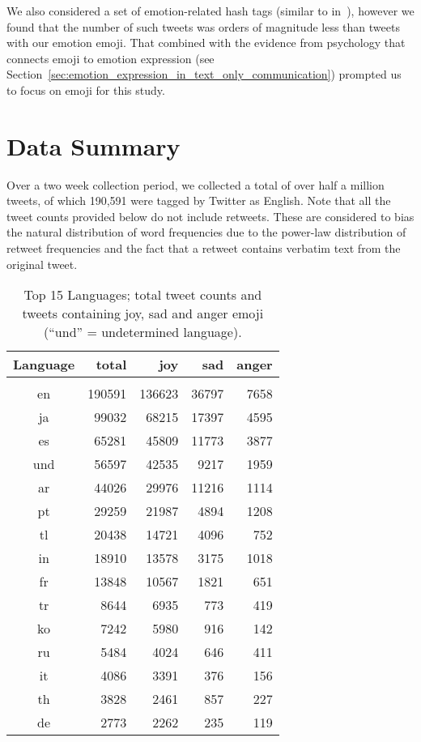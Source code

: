 \documentclass[10pt, a4paper]{article}
\begin{document}
We also considered a set of emotion-related hash tags (similar to in~\cite{Mohammad2012Emotional}), however we found that the number of such tweets was orders of magnitude less than tweets with our emotion emoji. That combined with the evidence from psychology that connects emoji to emotion expression (see Section~\ref{sec:emotion_expression_in_text_only_communication}) prompted us to focus on emoji for this study.

\section{Data Summary}
Over a two week collection period, we collected a total of over half a million tweets, of which 190,591 were tagged by Twitter as English.
Note that all the tweet counts provided below do not include retweets. 
These are considered to bias the natural distribution of word frequencies due to the power-law distribution of retweet frequencies and the fact that a retweet contains verbatim text from the original tweet.


\begin{table}
	\begin{tabular}{crrrr}
Language & total & joy & sad & anger \\
	\hline \\
en  & 190591 & 136623 & 36797 & 7658 \\
ja  & 99032 & 68215 & 17397 & 4595 \\
es  & 65281 & 45809 & 11773 & 3877 \\
und  & 56597 & 42535 & 9217 & 1959 \\
ar  & 44026 & 29976 & 11216 & 1114 \\
pt  & 29259 & 21987 & 4894 & 1208 \\
tl  & 20438 & 14721 & 4096 & 752 \\
in  & 18910 & 13578 & 3175 & 1018 \\
fr  & 13848 & 10567 & 1821 & 651 \\
tr  & 8644 & 6935 & 773 & 419 \\
ko  & 7242 & 5980 & 916 & 142 \\
ru  & 5484 & 4024 & 646 & 411 \\
it  & 4086 & 3391 & 376 & 156 \\
th  & 3828 & 2461 & 857 & 227 \\
de  & 2773 & 2262 & 235 & 119 \\
	\end{tabular}
	\caption{Top 15 Languages; total tweet counts and tweets containing joy, sad and anger emoji  (``und'' = undetermined language).}
	\label{tbl:top-ten-langs}
\end{table}
\end{document}
